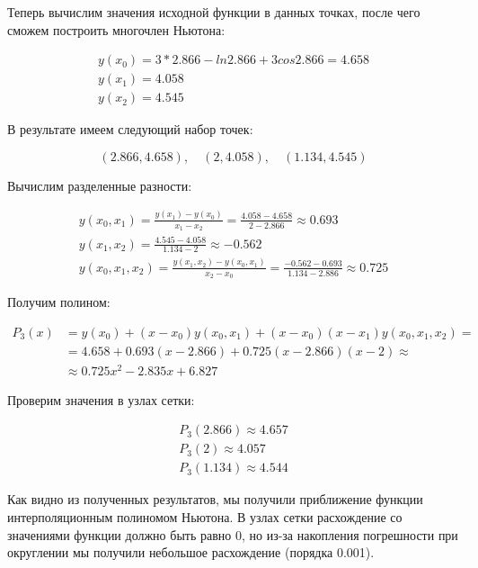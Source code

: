 \documentclass[11pt]{article}
\begin{document}
Теперь вычислим значения исходной функции в данных точках, после чего сможем построить многочлен Ньютона:

\begin{gather}
y(x_0) = 3 * 2.866 - ln 2.866 + 3 cos 2.866 = 4.658 \nonumber \\
y(x_1) = 4.058 \nonumber \\
y(x_2) = 4.545 \nonumber
\end{gather}

В результате имеем следующий набор точек:

\begin{equation}
(2.866, 4.658), \quad (2, 4.058), \quad (1.134, 4.545) \nonumber
\end{equation}

Вычислим разделенные разности:

\begin{gather}
y(x_0, x_1) = \frac{y(x_1) - y(x_0)}{x_1 - x_2} = \frac{4.058 - 4.658}{2 - 2.866} \approx 0.693 \nonumber \\
y(x_1, x_2) = \frac{4.545 - 4.058}{1.134 - 2} \approx -0.562 \nonumber \\
y(x_0, x_1, x_2) = \frac{y(x_1, x_2) - y(x_0, x_1)}{x_2 - x_0} = \frac{-0.562 - 0.693}{1.134 - 2.886} \approx 0.725 \nonumber
\end{gather}

Получим полином:

\begin{align}
P_3(x) &= y(x_0) + (x - x_0)y(x_0, x_1) + (x - x_0)(x - x_1)y(x_0, x_1, x_2) = \nonumber \\
        &= 4.658 + 0.693(x - 2.866) + 0.725(x - 2.866)(x - 2) \approx \nonumber \\
        &\approx 0.725x^2 - 2.835x + 6.827 \nonumber
\end{align}

Проверим значения в узлах сетки:

\begin{gather}
P_3(2.866) \approx 4.657 \nonumber \\
P_3(2) \approx 4.057 \nonumber \\
P_3(1.134) \approx 4.544 \nonumber
\end{gather}

Как видно из полученных результатов, мы получили приближение функции интерполяционным полиномом Ньютона. В узлах сетки расхождение со значениями функции должно быть равно 0, но из-за накопления погрешности при округлении мы получили небольшое расхождение (порядка 0.001).
\end{document}
